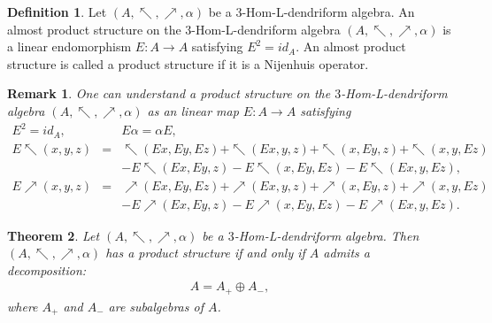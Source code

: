 \documentclass[a4paper,11pt]{article}
\def\a{\alpha}
\def\nw{\nwarrow}
\def\ne{\nearrow}
\newtheorem{thm}{Theorem}[section]
\newtheorem{rem}[thm]{Remark}
\theoremstyle{definition}
\newtheorem{defi}{Definition}[section]
\begin{document}
\begin{defi}
  Let $(A,\nw,\ne,\alpha)$ be a $3$-Hom-L-dendriform algebra. An almost product structure on the $3$-Hom-L-dendriform algebra  $(A,\nw,\ne,\alpha)$ is a linear endomorphism $E:A\to A$ satisfying $E^2 = id_A$. An almost
product structure is called a product structure if it is a Nijenhuis operator.
\end{defi}
\begin{rem}
  One can understand a product structure on the $3$-Hom-L-dendriform algebra  $(A,\nw,\ne,\alpha)$ as an linear map  $E:A\to A$ satisfying
  \begin{eqnarray}
  E^2=id_A,&&E\a=\a E,\nonumber\\
E\nw(x,y,z)&=&\nw(Ex,Ey,Ez)+\nw(Ex,y,z)+\nw(x,Ey,z)+\nw(x,y,Ez)\nonumber\\
\label{product structure1}&&-E\nw(Ex,Ey,z)-E\nw(x,Ey,Ez)-E\nw(Ex,y,Ez),\\
E\ne(x,y,z)&=&\ne(Ex,Ey,Ez)+\ne(Ex,y,z)+\ne(x,Ey,z)+\ne(x,y,Ez)\nonumber\\
&&-E\ne(Ex,Ey,z)-E\ne(x,Ey,Ez)-E\ne(Ex,y,Ez)
\label{product structure2}.
\end{eqnarray}

\end{rem}
\begin{thm}\label{product-structure-subalgebra}
Let $(A,\nw,\ne,\alpha)$ be a $3$-Hom-L-dendriform algebra. Then $(A,\nw,\ne,\alpha)$ has a product structure if and only if $ A$ admits a decomposition:
\begin{eqnarray}
 A= A_+\oplus A_-,
\end{eqnarray}
where $ A_+$ and $ A_-$ are subalgebras of $ A$.
\end{thm}
\end{document}
